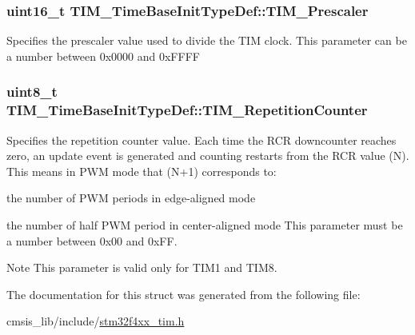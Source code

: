 \subsubsection[{\texorpdfstring{T\+I\+M\+\_\+\+Prescaler}{TIM_Prescaler}}]{\setlength{\rightskip}{0pt plus 5cm}uint16\+\_\+t T\+I\+M\+\_\+\+Time\+Base\+Init\+Type\+Def\+::\+T\+I\+M\+\_\+\+Prescaler}\hypertarget{struct_t_i_m___time_base_init_type_def_a6d3c8632780db819b2eb811e71ce251e}{}\label{struct_t_i_m___time_base_init_type_def_a6d3c8632780db819b2eb811e71ce251e}
Specifies the prescaler value used to divide the T\+IM clock. This parameter can be a number between 0x0000 and 0x\+F\+F\+FF 
\subsubsection[{\texorpdfstring{T\+I\+M\+\_\+\+Repetition\+Counter}{TIM_RepetitionCounter}}]{\setlength{\rightskip}{0pt plus 5cm}uint8\+\_\+t T\+I\+M\+\_\+\+Time\+Base\+Init\+Type\+Def\+::\+T\+I\+M\+\_\+\+Repetition\+Counter}\hypertarget{struct_t_i_m___time_base_init_type_def_a81648259851390e090e1f507dfea7de8}{}\label{struct_t_i_m___time_base_init_type_def_a81648259851390e090e1f507dfea7de8}
Specifies the repetition counter value. Each time the R\+CR downcounter reaches zero, an update event is generated and counting restarts from the R\+CR value (N). This means in P\+WM mode that (N+1) corresponds to\+:
\begin{DoxyItemize}
\item the number of P\+WM periods in edge-\/aligned mode
\item the number of half P\+WM period in center-\/aligned mode This parameter must be a number between 0x00 and 0x\+FF. \begin{DoxyNote}{Note}
This parameter is valid only for T\+I\+M1 and T\+I\+M8. 
\end{DoxyNote}

\end{DoxyItemize}

The documentation for this struct was generated from the following file\+:\begin{DoxyCompactItemize}
\item 
cmsis\+\_\+lib/include/\hyperlink{stm32f4xx__tim_8h}{stm32f4xx\+\_\+tim.\+h}\end{DoxyCompactItemize}
